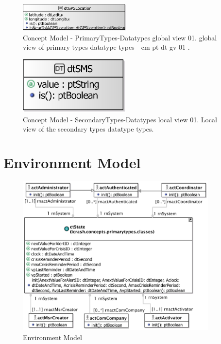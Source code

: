 \begin{figure}[H]
	\centering
	\captionsetup{justification=centering}
	\includegraphics[width=0.5\textwidth]{./images/cm-pt-dt-lv-02-dtGPSLocation.eps}
	\caption{Concept Model - PrimaryTypes-Datatypes global view 01. global view of primary types
datatype types - cm-pt-dt-gv-01 .}
\end{figure} 

\begin{figure}[H]
	\centering
	\captionsetup{justification=centering}
	\includegraphics[width=0.5\textwidth]{./images/cm-st-dt-lv-01.eps}
	\caption{Concept Model - SecondaryTypes-Datatypes local view 01. Local view of the secondary
types datatype types.}
\end{figure} 
   

\section{Environment Model}

\begin{figure}[h]
\begin{center}
\includegraphics[width=0.9\textwidth]{./images/env_model.eps}
\end{center}
\caption{Environment Model}
\end{figure}
